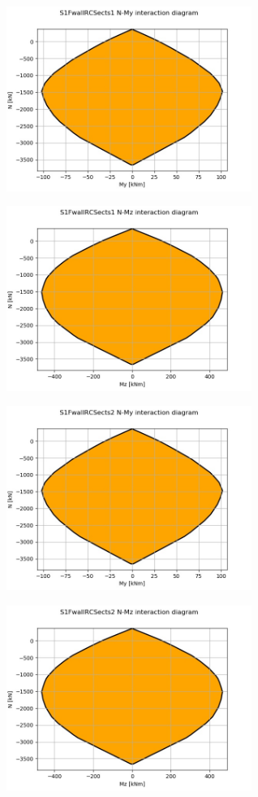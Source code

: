 
\begin{center}
\includegraphics[width=80mm]{ramp_wall/resLC/text/sections/S1FwallRCSects1NMy}
\end{center}
\begin{center}
\includegraphics[width=80mm]{ramp_wall/resLC/text/sections/S1FwallRCSects1NMz}
\end{center}

\begin{center}
\includegraphics[width=80mm]{ramp_wall/resLC/text/sections/S1FwallRCSects2NMy}
\end{center}
\begin{center}
\includegraphics[width=80mm]{ramp_wall/resLC/text/sections/S1FwallRCSects2NMz}
\end{center}
